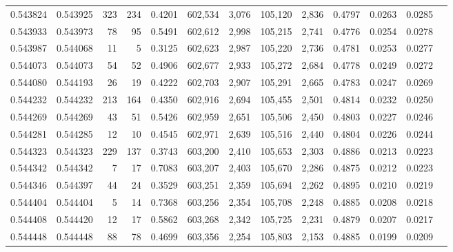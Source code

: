 \begin{tabular}{rrrrrrrrrrrrr}
0.543824 & 0.543925 &   323 &   234 &                                     0.4201 & 602,534 &   3,076 & 105,120 &   2,836 & 0.4797 & 0.0263 & 0.0285 \\
0.543933 & 0.543973 &    78 &    95 &                                     0.5491 & 602,612 &   2,998 & 105,215 &   2,741 & 0.4776 & 0.0254 & 0.0278 \\
0.543987 & 0.544068 &    11 &     5 &                                     0.3125 & 602,623 &   2,987 & 105,220 &   2,736 & 0.4781 & 0.0253 & 0.0277 \\
0.544073 & 0.544073 &    54 &    52 &                                     0.4906 & 602,677 &   2,933 & 105,272 &   2,684 & 0.4778 & 0.0249 & 0.0272 \\
0.544080 & 0.544193 &    26 &    19 &                                     0.4222 & 602,703 &   2,907 & 105,291 &   2,665 & 0.4783 & 0.0247 & 0.0269 \\
0.544232 & 0.544232 &   213 &   164 &                                     0.4350 & 602,916 &   2,694 & 105,455 &   2,501 & 0.4814 & 0.0232 & 0.0250 \\
0.544269 & 0.544269 &    43 &    51 &                                     0.5426 & 602,959 &   2,651 & 105,506 &   2,450 & 0.4803 & 0.0227 & 0.0246 \\
0.544281 & 0.544285 &    12 &    10 &                                     0.4545 & 602,971 &   2,639 & 105,516 &   2,440 & 0.4804 & 0.0226 & 0.0244 \\
0.544323 & 0.544323 &   229 &   137 &                                     0.3743 & 603,200 &   2,410 & 105,653 &   2,303 & 0.4886 & 0.0213 & 0.0223 \\
0.544342 & 0.544342 &     7 &    17 &                                     0.7083 & 603,207 &   2,403 & 105,670 &   2,286 & 0.4875 & 0.0212 & 0.0223 \\
0.544346 & 0.544397 &    44 &    24 &                                     0.3529 & 603,251 &   2,359 & 105,694 &   2,262 & 0.4895 & 0.0210 & 0.0219 \\
0.544404 & 0.544404 &     5 &    14 &                                     0.7368 & 603,256 &   2,354 & 105,708 &   2,248 & 0.4885 & 0.0208 & 0.0218 \\
0.544408 & 0.544420 &    12 &    17 &                                     0.5862 & 603,268 &   2,342 & 105,725 &   2,231 & 0.4879 & 0.0207 & 0.0217 \\
0.544448 & 0.544448 &    88 &    78 &                                     0.4699 & 603,356 &   2,254 & 105,803 &   2,153 & 0.4885 & 0.0199 & 0.0209 \\

\end{tabular}

